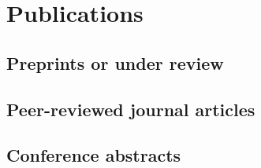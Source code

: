 \documentclass[12pt,a4paper,sans]{moderncv}   %
\begin{document}
\section{Publications}
\subsection{Preprints or under review}

\subsection{Peer-reviewed journal articles}

\subsection{Conference abstracts}

\end{document}
